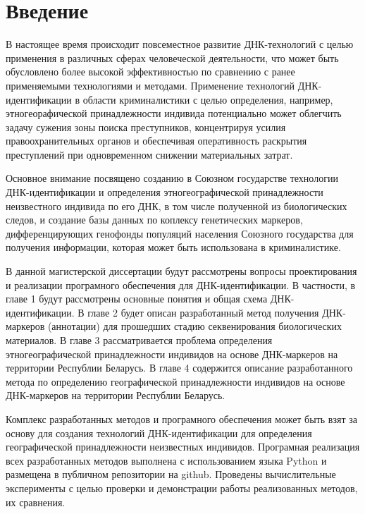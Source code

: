 \chapter*{Введение}

В настоящее время происходит повсеместное развитие ДНК-технологий с целью применения
в различных сферах человеческой деятельности, что может быть обусловлено более высокой
эффективностью по сравнению с ранее применяемыми технологиями и методами.
Применение технологий ДНК-идентификации в области криминалистики с целью определения,
например, этногеорафической принадлежности индивида потенциально может облегчить задачу сужения зоны поиска
преступников, концентрируя усилия правоохранительных органов и обеспечивая оперативность раскрытия преступлений
при одновременном снижении материальных затрат.

Основное внимание посвящено созданию в Союзном государстве технологии ДНК-идентификации и
определения этногеографической принадлежности неизвестного индивида по его ДНК,
в том числе полученной из биологических следов, и создание базы данных по коплексу генетических маркеров,
дифференцирующих генофонды популяций населения Союзного государства для получения информации, которая может быть
использована в криминалистике.

В данной магистерской диссертации будут рассмотрены вопросы проектирования и реализации
програмного обеспечения для ДНК-идентификации. В частности, в главе 1 будут рассмотрены основные понятия
и общая схема ДНК-идентификации. В главе 2 будет описан разработанный метод получения ДНК-маркеров (аннотации)
для прошедших стадию секвенирования биологических материалов. В главе 3 рассматривается проблема определения
этногеографической принадлежности индивидов на основе ДНК-маркеров на территории Республии Беларусь.
В главе 4 содержится описание разработанного метода по определению географической принадлежности
индивидов на основе ДНК-маркеров на территории Республии Беларусь.

Комплекс разработанных методов и програмного обеспечения может быть взят за основу для создания
технологий ДНК-идентификации для определения географической принадлежности неизвестных индивидов.
Програмная реализация всех разработанных методов выполнена с использованием языка Python
и размещена в публичном репозитории на github. Проведены вычислительные эксперименты с целью
проверки и демонстрации работы реализованных методов, их сравнения.
